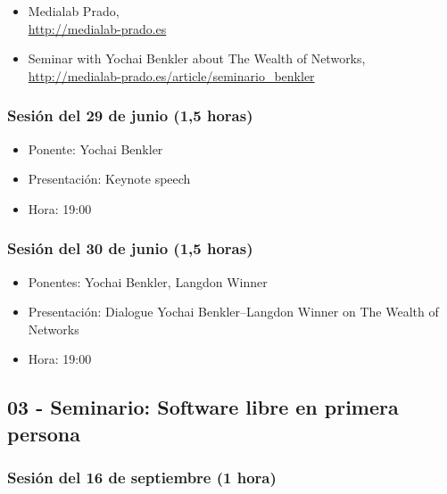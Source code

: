 \documentclass[a4paper,12pt]{article}
\begin{document}
\begin{itemize}
\item Medialab Prado, \\
  \url{http://medialab-prado.es}
\item Seminar with Yochai Benkler about The Wealth of Networks, \\
  \url{http://medialab-prado.es/article/seminario_benkler}
\end{itemize}

\subsubsection{Sesión del 29 de junio (1,5 horas)}

\begin{itemize}
\item Ponente: Yochai Benkler
\item Presentación: Keynote speech
\item Hora: 19:00
\end{itemize}

\subsubsection{Sesión del 30 de junio (1,5 horas)}

\begin{itemize}
\item Ponentes: Yochai Benkler, Langdon Winner
\item Presentación: Dialogue Yochai Benkler--Langdon Winner on The Wealth of Networks
\item Hora: 19:00
\end{itemize}

\subsection{03 - Seminario: Software libre en primera persona}

\subsubsection{Sesión del 16 de septiembre (1 hora)}
\end{document}
